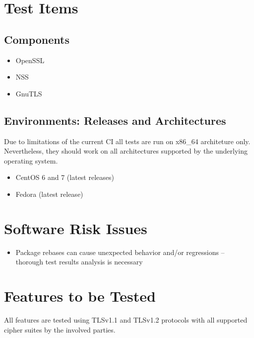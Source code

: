 \section{Test Items}
\subsection{Components}
    \begin{itemize}
        \item OpenSSL
        \item NSS
        \item GnuTLS
    \end{itemize}

\subsection{Environments: Releases and Architectures}
    Due to limitations of the current CI all tests are run on x86\_64 architeture
    only. Nevertheless, they should work on all architectures supported by
    the underlying operating system.

    \begin{itemize}
        \item CentOS 6 and 7 (latest releases)
        \item Fedora (latest release)
    \end{itemize}

\section{Software Risk Issues}
    \begin{itemize}
        \item Package rebases can cause unexpected behavior and/or regressions
              -- thorough test results analysis is necessary
    \end{itemize}

\section{Features to be Tested}
    All features are tested using TLSv1.1 and TLSv1.2 protocols with all supported
    cipher suites by the involved parties.

